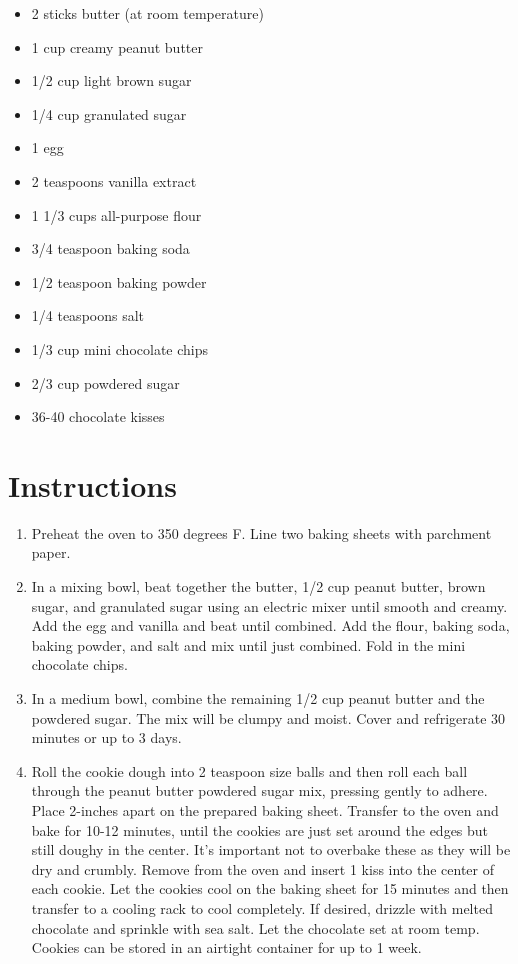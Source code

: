 \documentclass[
  letterpaper,
  DIV=11,
  numbers=noendperiod,
  titlepage=false]{scrreprt}
\providecommand{\tightlist}{%
  \setlength{\itemsep}{0pt}\setlength{\parskip}{0pt}}\usepackage{longtable,booktabs,array}
\begin{document}
\begin{itemize}
\tightlist
\item
  2 sticks butter (at room temperature)
\item
  1 cup creamy peanut butter
\item
  1/2 cup light brown sugar
\item
  1/4 cup granulated sugar
\item
  1 egg
\item
  2 teaspoons vanilla extract
\item
  1 1/3 cups all-purpose flour
\item
  3/4 teaspoon baking soda
\item
  1/2 teaspoon baking powder
\item
  1/4 teaspoons salt
\item
  1/3 cup mini chocolate chips
\item
  2/3 cup powdered sugar
\item
  36-40 chocolate kisses
\end{itemize}

\section{Instructions}\label{instructions-157}

\begin{enumerate}
\def\labelenumi{\arabic{enumi}.}
\tightlist
\item
  Preheat the oven to 350 degrees F. Line two baking sheets with
  parchment paper.
\item
  In a mixing bowl, beat together the butter, 1/2 cup peanut butter,
  brown sugar, and granulated sugar using an electric mixer until smooth
  and creamy. Add the egg and vanilla and beat until combined. Add the
  flour, baking soda, baking powder, and salt and mix until just
  combined. Fold in the mini chocolate chips.
\item
  In a medium bowl, combine the remaining 1/2 cup peanut butter and the
  powdered sugar. The mix will be clumpy and moist. Cover and
  refrigerate 30 minutes or up to 3 days.
\item
  Roll the cookie dough into 2 teaspoon size balls and then roll each
  ball through the peanut butter powdered sugar mix, pressing gently to
  adhere. Place 2-inches apart on the prepared baking sheet. Transfer to
  the oven and bake for 10-12 minutes, until the cookies are just set
  around the edges but still doughy in the center. It's important not to
  overbake these as they will be dry and crumbly. Remove from the oven
  and insert 1 kiss into the center of each cookie. Let the cookies cool
  on the baking sheet for 15 minutes and then transfer to a cooling rack
  to cool completely. If desired, drizzle with melted chocolate and
  sprinkle with sea salt. Let the chocolate set at room temp. Cookies
  can be stored in an airtight container for up to 1 week.
\end{enumerate}
\end{document}
